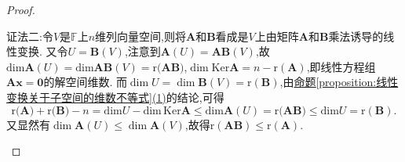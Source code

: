 \documentclass[../../main.tex]{subfiles}%
\begin{document}
\begin{proof}
\begin{enumerate}[(1)]
{\color{blue}证法二:}令\(V\)是\(\mathbb{F}\)上\(n\)维列向量空间,则将\(\boldsymbol{A}\)和\(\boldsymbol{B}\)看成是\(V\)上由矩阵\(\boldsymbol{A}\)和\(\boldsymbol{B}\)乘法诱导的线性变换. 又令\(U = \boldsymbol{B}(V)\),注意到\(\boldsymbol{A}(U)=\boldsymbol{A}\boldsymbol{B}(V)\),故\(\mathrm{dim}\boldsymbol{A}(U)=\mathrm{dim}\boldsymbol{AB}(V)=\mathrm{r(}\boldsymbol{AB})\),\(\dim\text{Ker}\boldsymbol{A}=n - \text{r}(\boldsymbol{A})\),即线性方程组\(\boldsymbol{A}\boldsymbol{x}=\boldsymbol{0}\)的解空间维数. 而\(\dim U=\dim\boldsymbol{B}(V)=\text{r}(\boldsymbol{B})\),由\hyperref[proposition:线性变换关于子空间的维数不等式]{命题\ref{proposition:线性变换关于子空间的维数不等式}(1)}的结论,可得
\[
\mathrm{r(}\boldsymbol{A})+\mathrm{r(}\boldsymbol{B})-n=\mathrm{dim}U-\mathrm{dim}\,\mathrm{Ker}\boldsymbol{A}\leqslant \mathrm{dim}\boldsymbol{A}\left( U \right) =\mathrm{r(}\boldsymbol{AB})\leqslant \mathrm{dim}U=\mathrm{r}\left( \boldsymbol{B} \right).
\]
又显然有\(\dim\boldsymbol{A}(U)\leqslant \dim\boldsymbol{A}(V)\),故得\(\text{r}(\boldsymbol{A}\boldsymbol{B})\leqslant \text{r}(\boldsymbol{A})\).


\end{enumerate}
\end{proof}
\end{document}
